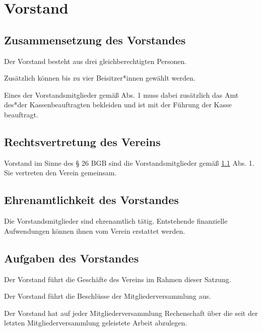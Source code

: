 \chapter{Vorstand}

\section{Zusammensetzung des Vorstandes}\label{cha:vorstand}
\begin{absätze}
    \item Der Vorstand besteht aus drei gleichberechtigten Personen.
    \item Zusätzlich können bis zu vier Beisitzer*innen gewählt werden.
    \item Eines der Vorstandsmitglieder gemäß Abs. 1 muss dabei zusätzlich das Amt des*der Kassenbeauftragten bekleiden und ist mit der Führung der Kasse beauftragt.        \end{absätze}

\section{Rechtsvertretung des Vereins}
\begin{absätze}
    \item Vorstand im Sinne des § 26 BGB sind die Vorstandsmitglieder gemäß \ref{cha:vorstand} Abs. 1. Sie vertreten den Verein gemeinsam.
\end{absätze}

\section{Ehrenamtlichkeit des Vorstandes}
Die Vorstandsmitglieder sind ehrenamtlich tätig. Entstehende finanzielle Aufwendungen können ihnen vom Verein erstattet werden.
    
\section{Aufgaben des Vorstandes}
\begin{absätze}
    \item Der Vorstand führt die Geschäfte des Vereins im Rahmen dieser Satzung.
    \item Der Vorstand führt die Beschlüsse der Mitgliederversammlung aus.
    \item Der Vorstand hat auf jeder Mitgliederversammlung Rechenschaft über die seit der letzten Mitgliederversammlung geleistete Arbeit abzulegen.
\end{absätze}

